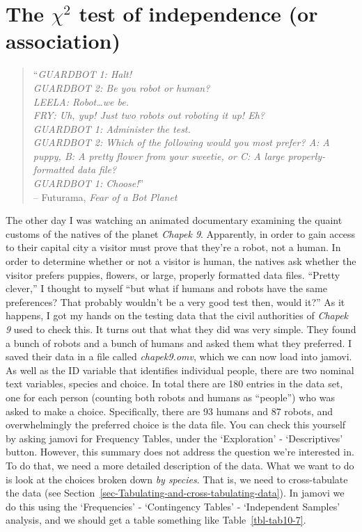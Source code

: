 \documentclass[
  a4paper,
]{book}
\begin{document}
\hypertarget{the-chi2-test-of-independence-or-association}{%
\section{\texorpdfstring{The \(\chi^2\) test of independence (or
association)}{The \textbackslash chi\^{}2 test of independence (or association)}}\label{the-chi2-test-of-independence-or-association}}

\begin{quote}
``\emph{GUARDBOT 1: Halt!\\
GUARDBOT 2: Be you robot or human?\\
LEELA: Robot\ldots we be.\\
FRY: Uh, yup! Just two robots out roboting it up! Eh?\\
GUARDBOT 1: Administer the test.\\
GUARDBOT 2: Which of the following would you most prefer? A: A puppy, B:
A pretty flower from your sweetie, or C: A large properly-formatted data
file?\\
GUARDBOT 1: Choose!}''\\

-- Futurama, \emph{Fear of a Bot Planet}
\end{quote}

The other day I was watching an animated documentary examining the
quaint customs of the natives of the planet \emph{Chapek 9}. Apparently,
in order to gain access to their capital city a visitor must prove that
they're a robot, not a human. In order to determine whether or not a
visitor is human, the natives ask whether the visitor prefers puppies,
flowers, or large, properly formatted data files. ``Pretty clever,'' I
thought to myself ``but what if humans and robots have the same
preferences? That probably wouldn't be a very good test then, would
it?'' As it happens, I got my hands on the testing data that the civil
authorities of \emph{Chapek 9} used to check this. It turns out that
what they did was very simple. They found a bunch of robots and a bunch
of humans and asked them what they preferred. I saved their data in a
file called \emph{chapek9.omv}, which we can now load into jamovi. As
well as the ID variable that identifies individual people, there are two
nominal text variables, species and choice. In total there are 180
entries in the data set, one for each person (counting both robots and
humans as ``people'') who was asked to make a choice. Specifically,
there are 93 humans and 87 robots, and overwhelmingly the preferred
choice is the data file. You can check this yourself by asking jamovi
for Frequency Tables, under the `Exploration' - `Descriptives' button.
However, this summary does not address the question we're interested in.
To do that, we need a more detailed description of the data. What we
want to do is look at the choices broken down \emph{by species}. That
is, we need to cross-tabulate the data (see
Section~\ref{sec-Tabulating-and-cross-tabulating-data}). In jamovi we do
this using the `Frequencies' - `Contingency Tables' - `Independent
Samples' analysis, and we should get a table something like
Table~\ref{tbl-tab10-7}.
\end{document}
